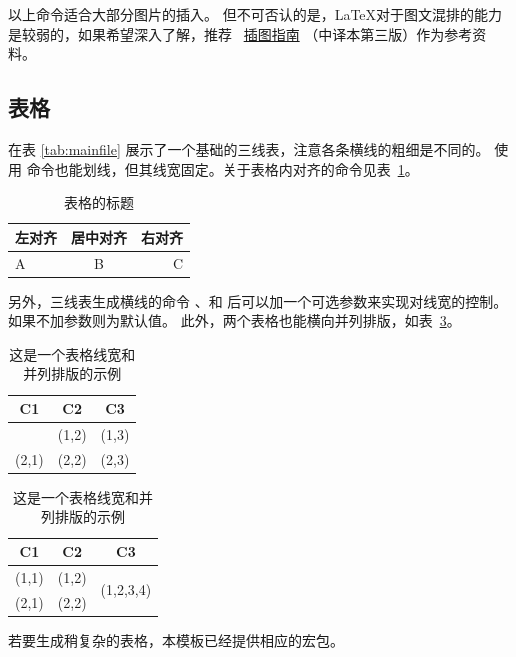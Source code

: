 以上命令适合大部分图片的插入。
但不可否认的是，\LaTeX{}对于图文混排的能力是较弱的，如果希望深入了解，推荐~
\href{https://github.com/WenboSheng/epslatex-cn}{\LaTeXe 插图指南}
（中译本第三版）作为参考资料。


\subsection{表格}\label{subsec:tab}
在表 \ref{tab:mainfile} 展示了一个基础的三线表，注意各条横线的粗细是不同的。
使用 命令也能划线，但其线宽固定。关于表格内对齐的命令见表~\ref{tab:ATable}。
\begin{table}[H]
	\centering
	\caption{表格的标题}\label{tab:ATable}
	\begin{tabular}{lcr}
		\hline
		左对齐 & 居中对齐 & 右对齐 \\
		\hline
		A      & B        & C      \\
		\hline
	\end{tabular}
\end{table}

另外，三线表生成横线的命令 、和
后可以加一个可选参数来实现对线宽的控制。
如果不加参数则为默认值。
此外，两个表格也能横向并列排版，如表~\ref{tab:2tab}。

\begin{table}[H]
	\centering
	\caption{这是一个表格线宽和并列排版的示例}
	\label{tab:2tab}
	\begin{tabular}{ccc}
		\toprule[1.5pt]
		C1    & C2    & C3    \\\midrule[1pt]
		(1,1) & (1,2) & (1,3) \\
		(2,1) & (2,2) & (2,3) \\\midrule[1pt]
	\end{tabular}
	\hspace{1cm}
	\begin{tabular}{ccc}
		\midrule
		C1    & C2    & C3                         \\\toprule
		(1,1) & (1,2) & \multirow{2}{*}{(1,2,3,4)} \\
		(2,1) & (2,2) &                            \\\bottomrule
	\end{tabular}
\end{table}

若要生成稍复杂的表格，本模板已经提供相应的宏包。


